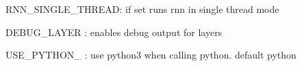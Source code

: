 {\ttfamily R\+N\+N\+\_\+\+S\+I\+N\+G\+L\+E\+\_\+\+T\+H\+R\+E\+AD}\+: if set runs rnn in single thread mode

{\ttfamily D\+E\+B\+U\+G\+\_\+\+L\+A\+Y\+ER} \+: enables debug output for layers

{\ttfamily U\+S\+E\+\_\+\+P\+Y\+T\+H\+O\+N\+\_} \+: use {\ttfamily python3} when calling python. default {\ttfamily python} 